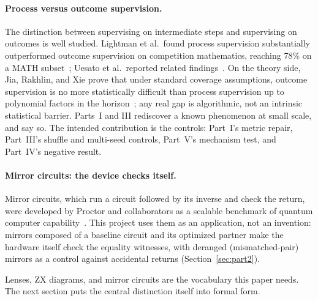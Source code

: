 \paragraph{Process versus outcome supervision.} The distinction between supervising on intermediate steps and supervising on outcomes is well studied. Lightman et al.\ found process supervision substantially outperformed outcome supervision on competition mathematics, reaching 78\% on a MATH subset~\cite{lightman2023verify}; Uesato et al.\ reported related findings~\cite{uesato2022solving}. On the theory side, Jia, Rakhlin, and Xie prove that under standard coverage assumptions, outcome supervision is no more statistically difficult than process supervision up to polynomial factors in the horizon~\cite{jia2025verify}; any real gap is algorithmic, not an intrinsic statistical barrier. Parts~I and III rediscover a known phenomenon at small scale, and say so. The intended contribution is the controls: Part~I's metric repair, Part~III's shuffle and multi-seed controls, Part~V's mechanism test, and Part~IV's negative result.

\paragraph{Mirror circuits: the device checks itself.} Mirror circuits, which run a circuit followed by its inverse and check the return, were developed by Proctor and collaborators as a scalable benchmark of quantum computer capability~\cite{proctor2022measuring}. This project uses them as an application, not an invention: mirrors composed of a baseline circuit and its optimized partner make the hardware itself check the equality witnesses, with deranged (mismatched-pair) mirrors as a control against accidental returns (Section~\ref{sec:part2}).

Lenses, ZX diagrams, and mirror circuits are the vocabulary this paper needs. The next section puts the central distinction itself into formal form.
